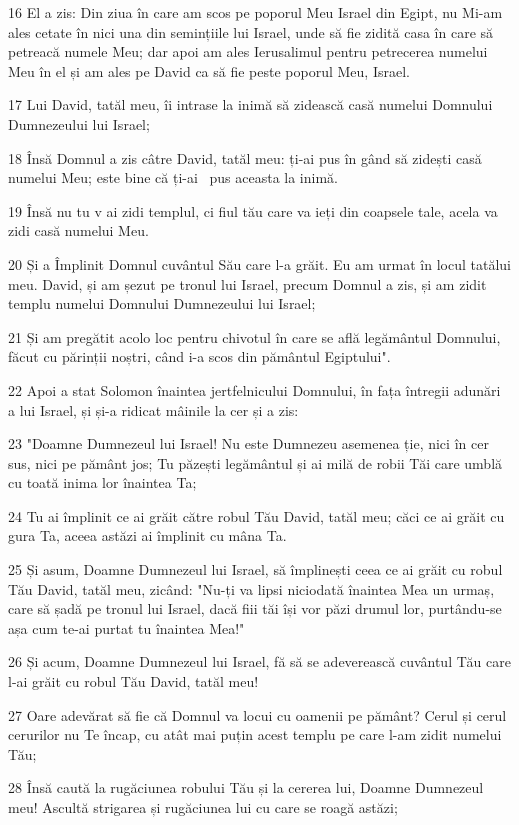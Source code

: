 \par 16 El a zis: Din ziua în care am scos pe poporul Meu Israel din Egipt, nu Mi-am ales cetate în nici una din semințiile lui Israel, unde să fie zidită casa în care să petreacă numele Meu; dar apoi am ales Ierusalimul pentru petrecerea numelui Meu în el și am ales pe David ca să fie peste poporul Meu, Israel.
\par 17 Lui David, tatăl meu, îi intrase la inimă să zidească casă numelui Domnului Dumnezeului lui Israel;
\par 18 Însă Domnul a zis câtre David, tatăl meu: ți-ai pus în gând să zidești casă numelui Meu; este bine că ți-ai  pus aceasta la inimă.
\par 19 Însă nu tu v ai zidi templul, ci fiul tău care va ieți din coapsele tale, acela va zidi casă numelui Meu.
\par 20 Și a Împlinit Domnul cuvântul Său care l-a grăit. Eu am urmat în locul tatălui meu. David, și am șezut pe tronul lui Israel, precum Domnul a zis, și am zidit templu numelui Domnului Dumnezeului lui Israel;
\par 21 Și am pregătit acolo loc pentru chivotul în care se află legământul Domnului, făcut cu părinții noștri, când i-a scos din pământul Egiptului".
\par 22 Apoi a stat Solomon înaintea jertfelnicului Domnului, în fața întregii adunări a lui Israel, și și-a ridicat mâinile la cer și a zis:
\par 23 "Doamne Dumnezeul lui Israel! Nu este Dumnezeu asemenea ție, nici în cer sus, nici pe pământ jos; Tu păzești legământul și ai milă de robii Tăi care umblă cu toată inima lor înaintea Ta;
\par 24 Tu ai împlinit ce ai grăit către robul Tău David, tatăl meu; căci ce ai grăit cu gura Ta, aceea astăzi ai împlinit cu mâna Ta.
\par 25 Și asum, Doamne Dumnezeul lui Israel, să împlinești ceea ce ai grăit cu robul Tău David, tatăl meu, zicând: "Nu-ți va lipsi niciodată înaintea Mea un urmaș, care să șadă pe tronul lui Israel, dacă fiii tăi își vor păzi drumul lor, purtându-se așa cum te-ai purtat tu înaintea Mea!"
\par 26 Și acum, Doamne Dumnezeul lui Israel, fă să se adeverească cuvântul Tău care l-ai grăit cu robul Tău David, tatăl meu!
\par 27 Oare adevărat să fie că Domnul va locui cu oamenii pe pământ? Cerul și cerul cerurilor nu Te încap, cu atât mai puțin acest templu pe care l-am zidit numelui Tău;
\par 28 Însă caută la rugăciunea robului Tău și la cererea lui, Doamne Dumnezeul meu! Ascultă strigarea și rugăciunea lui cu care se roagă astăzi;
